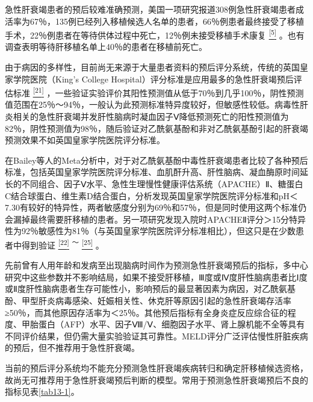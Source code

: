 急性肝衰竭患者的预后较难准确预测，美国一项研究报道308例急性肝衰竭患者成活率为67％，135例已经列入移植候选人名单的患者，66％例患者最终接受了移植手术，22％例患者在等待供体过程中死亡，12％例未接受移植手术康复
\protect\hyperlink{text00019.htmlux5cux23ch5-18}{\textsuperscript{{[}5{]}}}
。也有调查表明等待肝移植名单上40％的患者在移植前死亡。

由于病因的多样性，目前尚无来源于大量患者资料的预后评分系统，传统的英国皇家学院医院（King's
College Hospital）评分标准是应用最多的急性肝衰竭预后评估标准
\protect\hyperlink{text00019.htmlux5cux23ch21-18}{\textsuperscript{{[}21{]}}}
，一些验证实验评价其阳性预测值从低于70％到几乎100％，阴性预测值范围在25％～94％，一般认为此预测标准特异度较好，但敏感性较低。病毒性肝炎相关的急性肝衰竭并发肝性脑病时凝血因子Ⅴ降低预测死亡的阳性预测值为82％，阴性预测值为98％，随后验证对乙酰氨基酚和非对乙酰氨基酚引起的肝衰竭预测效果不如英国皇家学院医院评分标准。

在Bailey等人的Meta分析中，对于对乙酰氨基酚中毒性肝衰竭患者比较了各种预后标准，包括英国皇家学院医院评分标准、血肌酐升高、肝性脑病、凝血酶原时间延长的不同组合、因子Ⅴ水平、急性生理慢性健康评估系统（APACHE）Ⅱ、糖蛋白C结合球蛋白、维生素D结合蛋白，分析发现英国皇家学院医院评分标准和pH＜7.30有较好的特异性，两者敏感度分别为69％和57％，但是同时使用这两个标准仍会漏掉最终需要肝移植的患者。另一项研究发现入院时APACHEⅡ评分＞15分特异性为92％敏感性为81％（与英国皇家学院医院评分标准相比），但这只是在少数患者中得到验证
\protect\hyperlink{text00019.htmlux5cux23ch22-18}{\textsuperscript{{[}22{]}}}
\textsuperscript{～}
\protect\hyperlink{text00019.htmlux5cux23ch25-18}{\textsuperscript{{[}25{]}}}
。

先前曾有人用年龄和发病至出现脑病时间作为预测急性肝衰竭预后的指标，多中心研究中这些参数并不影响结局，如果不接受肝移植，Ⅲ度或Ⅳ度肝性脑病患者比Ⅰ度或Ⅱ度肝性脑病患者生存可能性小，影响预后的最显著因素为病因，对乙酰氨基酚、甲型肝炎病毒感染、妊娠相关性、休克肝等原因引起的急性肝衰竭存活率≥50％，而其他原因存活率为＜25％。其他预后指标有全身炎症反应综合征的程度、甲胎蛋白（AFP）水平、因子Ⅷ/Ⅴ、细胞因子水平、肾上腺机能不全等具有不同评价结果，但仍需大量实验验证其可靠性。MELD评分广泛评估慢性肝脏疾病的预后，但不推荐用于急性肝衰竭。

当前的预后评分系统均不能充分预测急性肝衰竭疾病转归和确定肝移植候选资格，故尚无可推荐用于急性肝衰竭预后判断的模型。常用于预测急性肝衰竭预后不良的指标见表\ref{tab13-1}。

